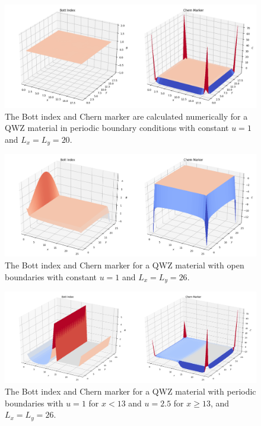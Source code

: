 \begin{figure}[p]
\begin{center}
 \includegraphics[width=\textwidth]{chern_bott_example}
\caption{The Bott index and Chern marker are calculated numerically for a QWZ material in periodic boundary conditions with constant $u = 1$ and $L_x = L_y = 20$.}
\label{fig:chern_bott_example}
\end{center}
\end{figure}
\begin{figure}[p]
\begin{center}
 \includegraphics[width=\textwidth]{chern_bott_open}
\caption{The Bott index and Chern marker for a QWZ material with open boundaries with constant $u = 1$ and $L_x = L_y = 26$.}
\label{fig:chern_bott_open}
\end{center}
\end{figure}
\begin{figure}[p]
\begin{center}
 \includegraphics[width=\textwidth]{chern_bott_split_periodic}
\caption{The Bott index and Chern marker for a QWZ material with periodic boundaries with $u = 1$ for $x<13$ and $u = 2.5$ for  $x\geq13$, and $L_x = L_y = 26$. }
\label{fig:chern_bott_split_periodic}
\end{center}
\end{figure}
